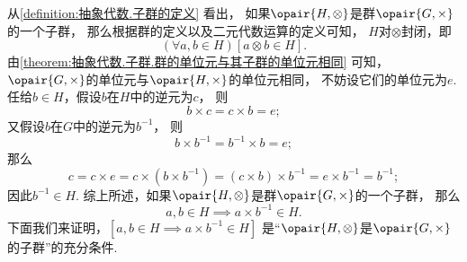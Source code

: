 从\cref{definition:抽象代数.子群的定义} 看出，
如果\(\opair{H,\otimes}\)是群\(\opair{G,\times}\)的一个子群，
那么根据群的定义以及二元代数运算的定义可知，
\(H\)对\(\otimes\)封闭，即\begin{equation*}
	(\forall a,b \in H)[a \otimes b \in H].
\end{equation*}
由\cref{theorem:抽象代数.子群.群的单位元与其子群的单位元相同} 可知，
\(\opair{G,\times}\)的单位元与\(\opair{H,\times}\)的单位元相同，
不妨设它们的单位元为\(e\).
任给\(b \in H\)，假设\(b\)在\(H\)中的逆元为\(c\)，
则\begin{equation*}
	b \times c = c \times b = e;
\end{equation*}
又假设\(b\)在\(G\)中的逆元为\(b^{-1}\)，
则\begin{equation*}
	b \times b^{-1} = b^{-1} \times b = e;
\end{equation*}
那么\begin{equation*}
	c = c \times e
	= c \times (b \times b^{-1})
	= (c \times b) \times b^{-1}
	= e \times b^{-1}
	= b^{-1};
\end{equation*}
因此\(b^{-1} \in H\).
综上所述，如果\(\opair{H,\otimes}\)是群\(\opair{G,\times}\)的一个子群，
那么\begin{equation*}
	a,b \in H
	\implies
	a \times b^{-1} \in H.
\end{equation*}
下面我们来证明，\([a,b \in H \implies a \times b^{-1} \in H]\)
是“\(\opair{H,\otimes}\)是\(\opair{G,\times}\)的子群”的充分条件.
